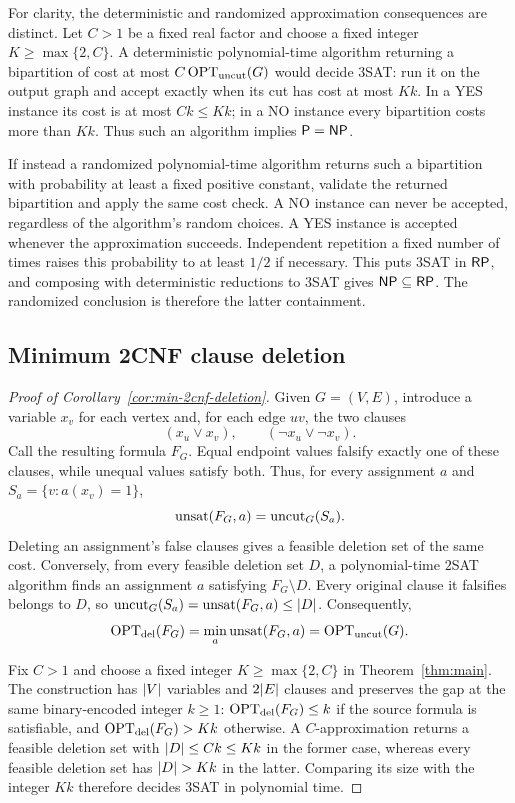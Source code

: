 For clarity, the deterministic and randomized approximation consequences
are distinct. Let $C>1$ be a fixed real factor and choose a fixed integer
$K\ge\max\{2,C\}$. A deterministic polynomial-time algorithm returning
a bipartition of cost at most $C\operatorname{OPT}_{\mathrm{uncut}}(G)$ would decide
$3$SAT: run it on the output graph and accept exactly when its cut has
cost at most $Kk$. In a YES instance its cost is at most $Ck\le Kk$;
in a NO instance every bipartition costs more than $Kk$. Thus such an
algorithm implies $\mathsf P=\mathsf{NP}$.

If instead a randomized polynomial-time algorithm returns such a
bipartition with probability at least a fixed positive constant, validate
the returned bipartition and apply the same cost check. A NO instance
can never be accepted, regardless of the algorithm's random choices.
A YES instance is accepted whenever the approximation succeeds.
Independent repetition a fixed number of times raises this probability
to at least $1/2$ if necessary. This puts $3$SAT in $\mathsf{RP}$, and composing
with deterministic reductions to $3$SAT gives $\mathsf{NP}\subseteq\mathsf{RP}$.
The randomized conclusion is therefore the latter containment.

\subsection{Minimum 2CNF clause deletion}
\label{sec:2cnf-consequence}

\begin{proof}[Proof of Corollary~\ref{cor:min-2cnf-deletion}]
Given $G=(V,E)$, introduce a variable $x_v$ for each vertex and, for each edge
$uv$, the two clauses
\[
 (x_u\lor x_v),\qquad(\neg x_u\lor\neg x_v).
\]
Call the resulting formula $F_G$. Equal endpoint values falsify exactly one
of these clauses, while unequal values satisfy both. Thus, for every
assignment $a$ and $S_a=\{v:a(x_v)=1\}$,
\[
 \operatorname{unsat}(F_G,a)=\operatorname{uncut}_G(S_a).
\]
Deleting an assignment's false clauses gives a feasible deletion set of the
same cost. Conversely, from every feasible deletion set $D$, a polynomial-time
$2$SAT algorithm finds an assignment $a$ satisfying $F_G\setminus D$.
Every original clause it falsifies belongs to $D$, so
$\operatorname{uncut}_G(S_a)=\operatorname{unsat}(F_G,a)\le\lvert D\rvert$. Consequently,
\[
 \operatorname{OPT}_{\rm del}(F_G)=\min_a\operatorname{unsat}(F_G,a)
                  =\operatorname{OPT}_{\rm uncut}(G).
\]

Fix $C>1$ and choose a fixed integer $K\ge\max\{2,C\}$ in
Theorem~\ref{thm:main}. The construction has $\lvert V\rvert$ variables and
$2\lvert E\rvert$ clauses and preserves the gap at the same binary-encoded integer
$k\ge1$: $\operatorname{OPT}_{\rm del}(F_G)\le k$ if the source formula is satisfiable,
and $\operatorname{OPT}_{\rm del}(F_G)>Kk$ otherwise. A $C$-approximation
returns a feasible deletion set with $\lvert D\rvert\le Ck\le Kk$ in the former
case, whereas every feasible deletion set has $\lvert D\rvert>Kk$ in the latter.
Comparing its size with the integer $Kk$ therefore decides $3$SAT in
polynomial time.
\end{proof}
